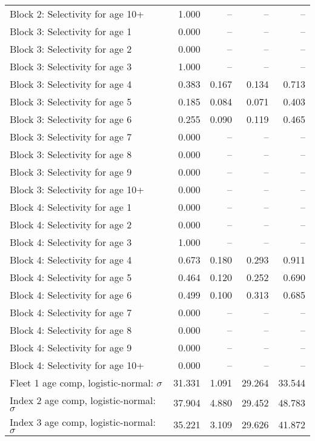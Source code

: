 \documentclass[
]{article}
\begin{document}
\begin{landscape}
\begin{longtable}[t]{lrrrr}
Block 2: Selectivity for age 10+ & 1.000 & -- & -- & --\\
Block 3: Selectivity for age 1 & 0.000 & -- & -- & --\\
Block 3: Selectivity for age 2 & 0.000 & -- & -- & --\\
Block 3: Selectivity for age 3 & 1.000 & -- & -- & --\\
\addlinespace
Block 3: Selectivity for age 4 & 0.383 & 0.167 & 0.134 & 0.713\\
Block 3: Selectivity for age 5 & 0.185 & 0.084 & 0.071 & 0.403\\
Block 3: Selectivity for age 6 & 0.255 & 0.090 & 0.119 & 0.465\\
Block 3: Selectivity for age 7 & 0.000 & -- & -- & --\\
Block 3: Selectivity for age 8 & 0.000 & -- & -- & --\\
\addlinespace
Block 3: Selectivity for age 9 & 0.000 & -- & -- & --\\
Block 3: Selectivity for age 10+ & 0.000 & -- & -- & --\\
Block 4: Selectivity for age 1 & 0.000 & -- & -- & --\\
Block 4: Selectivity for age 2 & 0.000 & -- & -- & --\\
Block 4: Selectivity for age 3 & 1.000 & -- & -- & --\\
\addlinespace
Block 4: Selectivity for age 4 & 0.673 & 0.180 & 0.293 & 0.911\\
Block 4: Selectivity for age 5 & 0.464 & 0.120 & 0.252 & 0.690\\
Block 4: Selectivity for age 6 & 0.499 & 0.100 & 0.313 & 0.685\\
Block 4: Selectivity for age 7 & 0.000 & -- & -- & --\\
Block 4: Selectivity for age 8 & 0.000 & -- & -- & --\\
\addlinespace
Block 4: Selectivity for age 9 & 0.000 & -- & -- & --\\
Block 4: Selectivity for age 10+ & 0.000 & -- & -- & --\\
Fleet 1 age comp, logistic-normal: $\sigma$ & 31.331 & 1.091 & 29.264 & 33.544\\
Index 2 age comp, logistic-normal: $\sigma$ & 37.904 & 4.880 & 29.452 & 48.783\\
Index 3 age comp, logistic-normal: $\sigma$ & 35.221 & 3.109 & 29.626 & 41.872\\*
\end{longtable}
\end{landscape}
\end{document}
